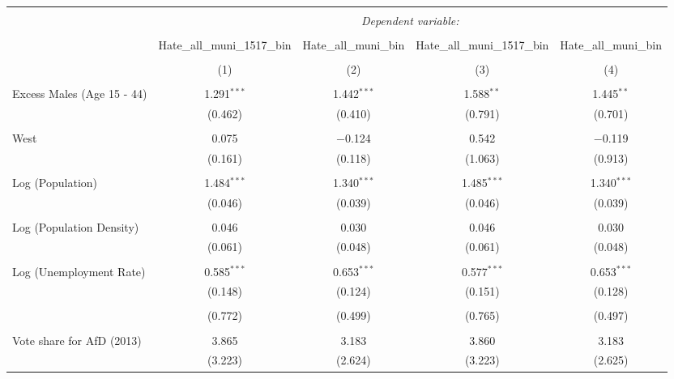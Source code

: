 
\begin{table}[!htbp] \centering 
  \caption{} 
  \label{} 
\begin{tabular}{@{\extracolsep{5pt}}lcccc} 
\\[-1.8ex]\hline 
\hline \\[-1.8ex] 
 & \multicolumn{4}{c}{\textit{Dependent variable:}} \\ 
\cline{2-5} 
\\[-1.8ex] & Hate\_all\_muni\_1517\_bin & Hate\_all\_muni\_bin & Hate\_all\_muni\_1517\_bin & Hate\_all\_muni\_bin \\ 
\\[-1.8ex] & (1) & (2) & (3) & (4)\\ 
\hline \\[-1.8ex] 
 Excess Males (Age 15 - 44) & 1.291$^{***}$ & 1.442$^{***}$ & 1.588$^{**}$ & 1.445$^{**}$ \\ 
  & (0.462) & (0.410) & (0.791) & (0.701) \\ 
  & & & & \\ 
 West & 0.075 & $-$0.124 & 0.542 & $-$0.119 \\ 
  & (0.161) & (0.118) & (1.063) & (0.913) \\ 
  & & & & \\ 
 Log (Population) & 1.484$^{***}$ & 1.340$^{***}$ & 1.485$^{***}$ & 1.340$^{***}$ \\ 
  & (0.046) & (0.039) & (0.046) & (0.039) \\ 
  & & & & \\ 
 Log (Population Density) & 0.046 & 0.030 & 0.046 & 0.030 \\ 
  & (0.061) & (0.048) & (0.061) & (0.048) \\ 
  & & & & \\ 
 Log (Unemployment Rate) & 0.585$^{***}$ & 0.653$^{***}$ & 0.577$^{***}$ & 0.653$^{***}$ \\ 
  & (0.148) & (0.124) & (0.151) & (0.128) \\ 
  & & & & \\ 
  & (0.772) & (0.499) & (0.765) & (0.497) \\ 
  & & & & \\ 
 Vote share for AfD (2013) & 3.865 & 3.183 & 3.860 & 3.183 \\ 
  & (3.223) & (2.624) & (3.223) & (2.625) \\ 

\end{tabular}
\end{table}
